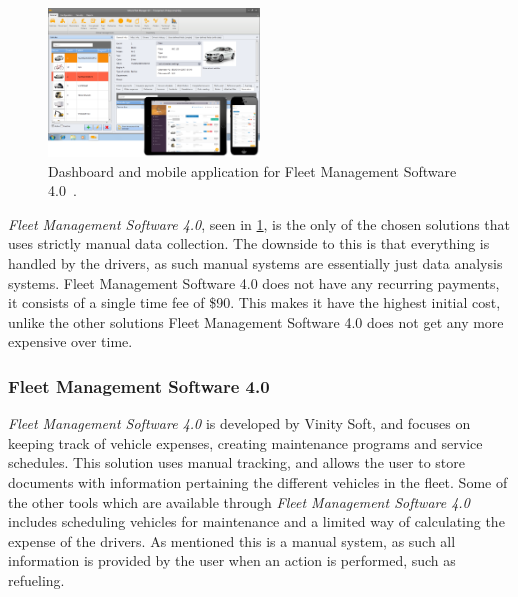 \begin{figure}[h!]
    \centering
    \includegraphics[width=0.5\textwidth]{img/FleetManagementSoftware.png}
	\caption{Dashboard and mobile application for Fleet Management Software 4.0~\cite{fleetms4}.}
    \label{fig:Fleet_Management_Software}
\end{figure}
\textit{Fleet Management Software 4.0}, seen in \cref{fig:Fleet_Management_Software}, is the only of the chosen solutions that uses strictly manual data collection.
The downside to this is that everything is handled by the drivers, as such manual systems are essentially just data analysis systems.
Fleet Management Software 4.0 does not have any recurring payments, it consists of a single time fee of \$90.
This makes it have the highest initial cost, unlike the other solutions Fleet Management Software 4.0 does not get any more expensive over time.

\subsubsection{Fleet Management Software 4.0}
\textit{Fleet Management Software 4.0} is developed by Vinity Soft, and focuses on keeping track of vehicle expenses, creating maintenance programs and service schedules\cite{vinitysoft}.
This solution uses manual tracking, and allows the user to store documents with information pertaining the different vehicles in the fleet.
Some of the other tools which are available through \textit{Fleet Management Software 4.0} includes scheduling vehicles for maintenance and a limited way of calculating the expense of the drivers.
As mentioned this is a manual system, as such all information is provided by the user when an action is performed, such as refueling.

